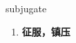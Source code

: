 
\begin{frame}
{\huge subjugate}
\begin{center}
\begin{enumerate}\Large
  \item \textbf{征服，镇压}
\end{enumerate}
\end{center}
\end{frame}
